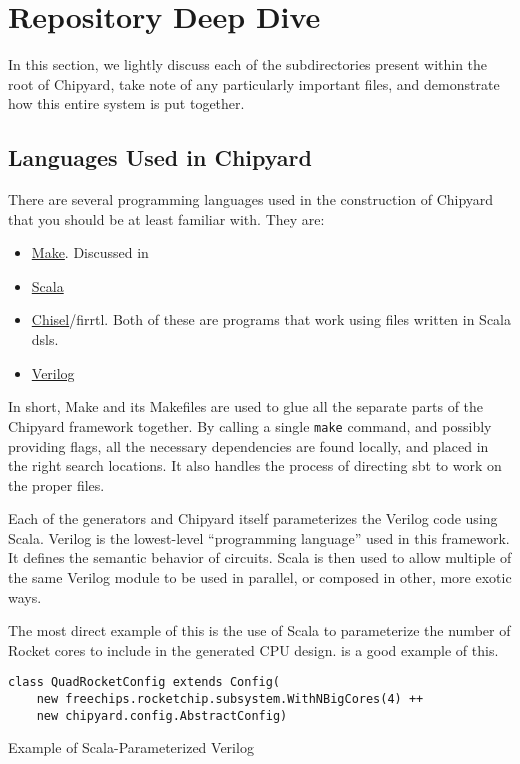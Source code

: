 \chapter{Repository Deep Dive}\label{chap:Repository_Deep_Dive}
In this section, we lightly discuss each of the subdirectories present within the root of Chipyard, take note of any particularly important files, and demonstrate how this entire system is put together.

\section{Languages Used in Chipyard}\label{sec:Langs_used_in_Chipyard}
There are several programming languages used in the construction of Chipyard that you should be at least familiar with.
They are:
\begin{itemize}
\item \href{https://www.gnu.org/software/make/}{Make}.
  Discussed in 
\item \href{https://www.scala-lang.org/}{Scala}
\item \href{https://www.chisel-lang.org/}{Chisel}/\Gls{firrtl}.
  Both of these are programs that work using files written in Scala \glspl{dsl}.
\item \href{https://en.wikipedia.org/wiki/Verilog}{Verilog}
\end{itemize}

In short, Make and its Makefiles are used to glue all the separate parts of the Chipyard framework together.
By calling a single \texttt{make} command, and possibly providing flags, all the necessary dependencies are found locally, and placed in the right search locations.
It also handles the process of directing \gls{sbt} to work on the proper files.

Each of the generators and Chipyard itself parameterizes the Verilog code using Scala.
Verilog is the lowest-level ``programming language'' used in this framework.
It defines the semantic behavior of circuits.
Scala is then used to allow multiple of the same Verilog module to be used in parallel, or composed in other, more exotic ways.

The most direct example of this is the use of Scala to parameterize the number of Rocket cores to include in the generated CPU design.
 is a good example of this.

\begin{listing}[h!tbp]
\begin{verbatim}
class QuadRocketConfig extends Config(
    new freechips.rocketchip.subsystem.WithNBigCores(4) ++
    new chipyard.config.AbstractConfig)
\end{verbatim}
\caption{Example of Scala-Parameterized Verilog}
\label{lst:Scala_Parameterized_Verilog}
\end{listing}

